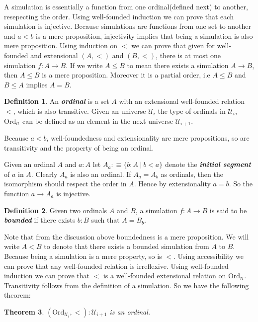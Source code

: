 \documentclass[10pt]{article}
\theoremstyle{definition}
\newtheorem{definition}{Definition}[section]
\theoremstyle{plain}
\newtheorem{theorem}[definition]{Theorem}
\theoremstyle{remark}
\newcommand{\U}{\mathscr{U}}
\begin{document}
A simulation is essentially a function from one ordinal(defined next) to another, 
resepecting the order. Using well-founded induction we can prove that each simulation is 
injective. Because simulations are functions from one set to another and $a<b$ is a mere 
proposition, injectivity implies that being a simulation is also mere proposition. Using 
induction on $<$ we can prove that given for well-founded and extensional $(A,<)$ and $(B,<)$, 
there is at most one simulation $f:A \to B$. If we write $A \leq B$ to mean there exists a 
simulation $A \to B$, then $A \leq B$ is a mere proposition. Moreover it is a partial order, 
i.e $A \leq B$ and $B \leq A$ implies $A = B$. 

\begin{definition}\label{D:Ordinal}
An \textbf{\textit{ordinal}} is a set $A$ with an extensional well-founded relation $<$, which
is also transitive. Given an universe $\U_i$ the type of ordinals in $\U_{i}$, $\text{Ord}_{\U}$
can be defined as an element in the next universe $\U_{i+1}$.
\end{definition}

Because $a < b$, well-foundedness and extensionality are mere propositions, so are
transitivity and the property of being an ordinal.\smallskip

Given an ordinal $A$ and $a : A$ let $A_a :\equiv \{ b : A\ |\ b < a\}$ denote the 
\textbf{\textit{initial segment}} of $a$ in $A$. Clearly $A_a$ is also an ordinal. If 
$A_a = A_b$ as ordinals, then the isomorphism should respect the order in $A$. Hence by 
extensionality $a = b$. So the function $a \to A_a$ is injective. 

\begin{definition}\label{D:Bdd sim}
Given two ordinals $A$ and $B$, a simulation $f : A \to B$ is said to be 
\textbf{\textit{bounded}} if there exists $b : B$ such that $A = B_b$. 
\end{definition}

Note that from the discussion above boundedness is a mere proposition. We will write 
$A < B$ to denote that there exists a bounded simulation from $A$ to $B$. Because being a 
simulation is a mere property, so is $<$. Using accessibility we can prove that any 
well-founded relation is irreflexive. Using well-founded induction we can prove that $<$
is a well-founded extensional relation on $\text{Ord}_{\U}$. Transitivity follows from 
the definition of a simulation. So we have the following theorem:
\begin{theorem}
$(\text{Ord}_{\U_i},<) : \U_{i+1}$ is an ordinal.
\end{theorem}
\end{document}
